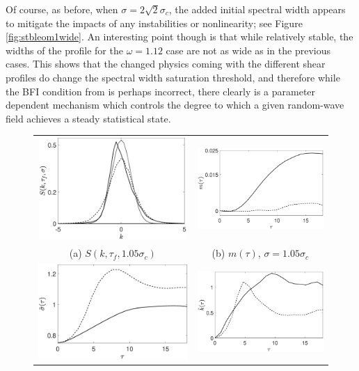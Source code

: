 \documentclass[a4paper,11pt]{article}
\begin{document}
Of course, as before, when $\sigma=2\sqrt{2}\sigma_{c}$, the added initial spectral width appears to mitigate the impacts of any instabilities or nonlinearity; see Figure \ref{fig:stbleom1wide}.  An interesting point though is that while relatively stable, the widths of the profile for the $\omega=1.12$ case are not as wide as in the previous cases.  This shows that the changed physics coming with the different shear profiles do change the spectral width saturation threshold, and therefore while the BFI condition from \cite{alber} is perhaps incorrect, there clearly is a parameter dependent mechanism which controls the degree to which a given random-wave field achieves a steady statistical state.  
\begin{figure}[!ht]
\centering
\begin{tabular}{cc}
\includegraphics[width=60mm, height=39mm]{pdf_w_1pt12_ep_pt05_Nens_512_sig0_1pt05} & \includegraphics[width=.48\textwidth]{mean_w_1pt12_ep_pt05_Nens_512_sig0_1pt05} \\
(a) $S(k,\tau_{f},1.05\sigma_{c})$ & (b) $m(\tau)$, $\sigma = 1.05\sigma_{c}$\\
\includegraphics[width=.48\textwidth]{std_w_1pt12_ep_pt05_Nens_512_sig0_1pt05} & \includegraphics[width=.48\textwidth]{kts_w_1pt12_ep_pt05_Nens_512_sig0_1pt05} \\

\end{tabular}
\end{figure}
\end{document}

